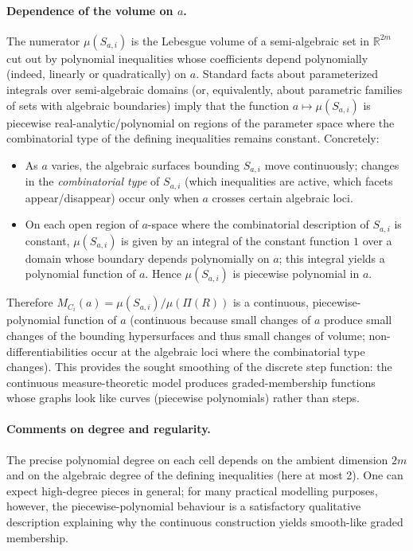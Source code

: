 \documentclass{article}
\begin{document}
\paragraph{Dependence of the volume on \(a\).}
The numerator \(\mu(S_{a,i})\) is the Lebesgue volume of a semi-algebraic set in \(\mathbb{R}^{2m}\) cut out by polynomial inequalities whose coefficients depend polynomially (indeed, linearly or quadratically) on \(a\). Standard facts about parameterized integrals over semi-algebraic domains (or, equivalently, about parametric families of sets with algebraic boundaries) imply that the function \(a\mapsto\mu(S_{a,i})\) is piecewise real-analytic/polynomial on regions of the parameter space where the combinatorial type of the defining inequalities remains constant. Concretely:
\begin{itemize}
  \item As \(a\) varies, the algebraic surfaces bounding \(S_{a,i}\) move continuously; changes in the \emph{combinatorial type} of \(S_{a,i}\) (which inequalities are active, which facets appear/disappear) occur only when \(a\) crosses certain algebraic loci.
  \item On each open region of \(a\)-space where the combinatorial description of \(S_{a,i}\) is constant, \(\mu(S_{a,i})\) is given by an integral of the constant function \(1\) over a domain whose boundary depends polynomially on \(a\); this integral yields a polynomial function of \(a\). Hence \(\mu(S_{a,i})\) is piecewise polynomial in \(a\).
\end{itemize}
Therefore \(M_{C_i}(a)=\mu(S_{a,i})/\mu(\Pi(R))\) is a continuous, piecewise-polynomial function of \(a\) (continuous because small changes of \(a\) produce small changes of the bounding hypersurfaces and thus small changes of volume; non-differentiabilities occur at the algebraic loci where the combinatorial type changes). This provides the sought smoothing of the discrete step function: the continuous measure-theoretic model produces graded-membership functions whose graphs look like curves (piecewise polynomials) rather than steps.

\paragraph{Comments on degree and regularity.}
The precise polynomial degree on each cell depends on the ambient dimension \(2m\) and on the algebraic degree of the defining inequalities (here at most 2). One can expect high-degree pieces in general; for many practical modelling purposes, however, the piecewise-polynomial behaviour is a satisfactory qualitative description explaining why the continuous construction yields smooth-like graded membership.
\end{document}
